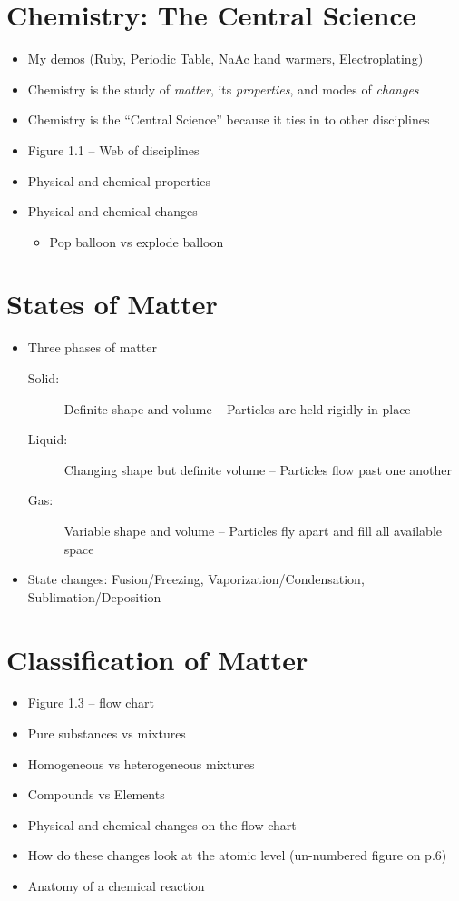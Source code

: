 \documentclass[12pt, openany, letterpaper]{memoir}
\begin{document}
\section{Chemistry: The Central Science}
\begin{itemize}
	\item My demos (Ruby, Periodic Table, NaAc hand warmers, Electroplating)
  \item Chemistry is the study of \emph{matter}, its \emph{properties}, and modes of \emph{changes}
	\item Chemistry is the ``Central Science'' because it ties in to other disciplines
	\item Figure 1.1 -- Web of disciplines
	\item Physical and chemical properties
	\item Physical and chemical changes
		\begin{itemize}
			\item Pop balloon vs explode balloon
		\end{itemize}	
\end{itemize}

\section{States of Matter}
\begin{itemize}
	\item Three phases of matter
    \begin{description}
      \item[Solid:] Definite shape and volume -- Particles are held rigidly in place
      \item[Liquid:] Changing shape but definite volume -- Particles flow past one another
      \item[Gas:] Variable shape and volume -- Particles fly apart and fill all available space
    \end{description}
	\item State changes: Fusion/Freezing, Vaporization/Condensation, Sublimation/Deposition
\end{itemize}

\section{Classification of Matter}
\begin{itemize}
	\item Figure 1.3 -- flow chart
	\item Pure substances vs mixtures
	\item Homogeneous vs heterogeneous mixtures
	\item Compounds vs Elements
	\item Physical and chemical changes on the flow chart
  \item How do these changes look at the atomic level (un-numbered figure on p.6)
	\item Anatomy of a chemical reaction
\end{itemize}
\end{document}
